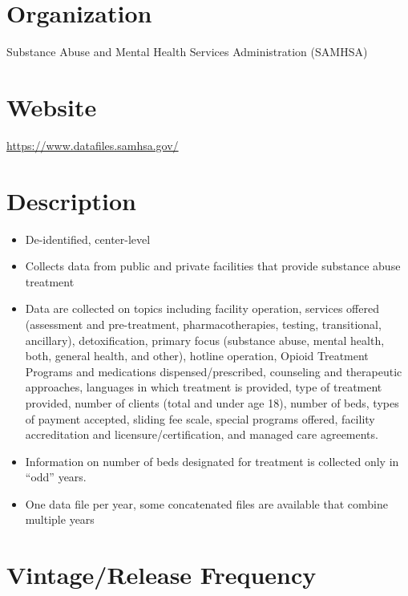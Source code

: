 \documentclass[
]{book}
\providecommand{\tightlist}{%
  \setlength{\itemsep}{0pt}\setlength{\parskip}{0pt}}
\begin{document}
\hypertarget{organization-64}{%
\section{Organization}\label{organization-64}}

Substance Abuse and Mental Health Services Administration (SAMHSA)

\hypertarget{website-64}{%
\section{Website}\label{website-64}}

\url{https://www.datafiles.samhsa.gov/}

\hypertarget{description-64}{%
\section{Description}\label{description-64}}

\begin{itemize}
\tightlist
\item
  De-identified, center-level
\item
  Collects data from public and private facilities that provide substance abuse treatment
\item
  Data are collected on topics including facility operation, services offered (assessment and pre-treatment, pharmacotherapies, testing, transitional, ancillary), detoxification, primary focus (substance abuse, mental health, both, general health, and other), hotline operation, Opioid Treatment Programs and medications dispensed/prescribed, counseling and therapeutic approaches, languages in which treatment is provided, type of treatment provided, number of clients (total and under age 18), number of beds, types of payment accepted, sliding fee scale, special programs offered, facility accreditation and licensure/certification, and managed care agreements.
\item
  Information on number of beds designated for treatment is collected only in ``odd'' years.
\item
  One data file per year, some concatenated files are available that combine multiple years
\end{itemize}

\hypertarget{vintagerelease-frequency-64}{%
\section{Vintage/Release Frequency}\label{vintagerelease-frequency-64}}
\end{document}
